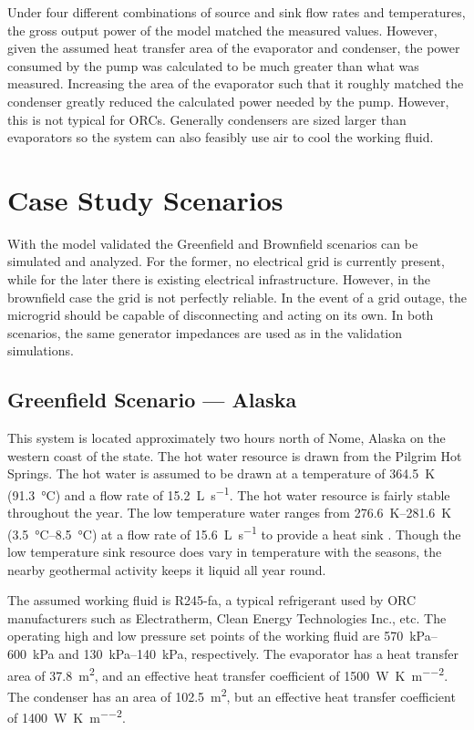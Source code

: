 Under four different combinations of source and sink flow rates and temperatures, the gross output power of the model matched the measured values. However, given the assumed heat transfer area of the evaporator and condenser, the power consumed by the pump was calculated to be much greater than what was measured. Increasing the area of the evaporator such that it roughly matched the condenser greatly reduced the calculated power needed by the pump. However, this is not typical for ORCs. Generally condensers are sized larger than evaporators so the system can also feasibly use air to cool the working fluid. 
\clearpage

\section{Case Study Scenarios}
With the model validated the Greenfield and Brownfield scenarios can be simulated and analyzed. For the former, no electrical grid is currently present, while for the later there is existing electrical infrastructure. However, in the brownfield case the grid is not perfectly reliable. In the event of a grid outage, the microgrid should be capable of disconnecting and acting on its own. In both scenarios, the same generator impedances are used as in the validation simulations. 

\subsection{Greenfield Scenario --- Alaska}
This system is located approximately two hours north of Nome, Alaska on the western coast of the state. The hot water resource is drawn from the Pilgrim Hot Springs. The hot water is assumed to be drawn at a temperature of \SI{364.5}{\kelvin} (\SI{91.3}{\degreeCelsius}) and a flow rate of \SI{15.2}{\liter\per\second}. The hot water resource is fairly stable throughout the year. The low temperature water ranges from \SIrange{276.6}{281.6}{\kelvin} (\SIrange{3.5}{8.5}{\degreeCelsius}) at a flow rate of \SI{15.6}{\liter\per\second} to provide a heat sink \cite{Haselwimmer2013, AlaskaCenterforEnergyandPower2014}. Though the low temperature sink resource does vary in temperature with the seasons, the nearby geothermal activity keeps it liquid all year round.

The assumed working fluid is R245-fa, a typical refrigerant used by ORC manufacturers such as Electratherm, Clean Energy Technologies Inc., etc. The operating high and low pressure set points of the working fluid are \SIrange{570}{600}{\kilo\pascal} and \SIrange{130}{140}{\kilo\pascal}, respectively. The evaporator has a heat transfer area of \SI{37.8}{\meter\squared}, and an effective heat transfer coefficient of \SI{1500}{\watt\per\kelvin\per\meter\squared}. The condenser has an area of \SI{102.5}{\meter\squared}, but an effective heat transfer coefficient of \SI{1400}{\watt\per\kelvin\per\meter\squared}.

